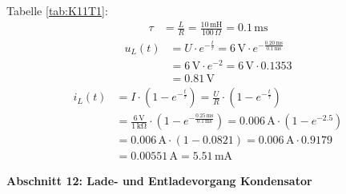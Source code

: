 Tabelle \ref{tab:K11T1}:
\begin{align*}
    \tau &= \frac{L}{R} = \frac{10 \, \mathrm{mH}}{100 \, \Omega} = 0.1 \, \mathrm{ms}
\end{align*}
\begin{align*}
    u_L(t) &= U \cdot e^{-\frac{t}{\tau}} = 6 \, \mathrm{V} \cdot e^{-\frac{0.20 \, \mathrm{ms}}{0.1 \, \mathrm{ms}}} \\
&= 6 \, \mathrm{V} \cdot e^{-2} = 6 \, \mathrm{V} \cdot 0.1353 \\
    &= 0.81 \, \mathrm{V}
\end{align*}
\begin{align*}
    i_L(t) &= I \cdot \left( 1 - e^{-\frac{t}{\tau}} \right) = \frac{U}{R} \cdot \left( 1 - e^{-\frac{t}{\tau}} \right) \\
    &= \frac{6 \, \mathrm{V}}{1 \, \mathrm{k\Omega}} \cdot \left( 1 - e^{-\frac{0.25 \, \mathrm{ms}}{0.1 \, \mathrm{ms}}} \right) = 0.006 \, \mathrm{A} \cdot \left( 1 - e^{-2.5} \right) \\
    &= 0.006 \, \mathrm{A} \cdot \left( 1 - 0.0821 \right) = 0.006 \, \mathrm{A} \cdot 0.9179 \\
    &= 0.00551 \, \mathrm{A} = 5.51 \, \mathrm{mA}
\end{align*}

\large \textbf{Abschnitt 12: Lade- und Entladevorgang Kondensator}

